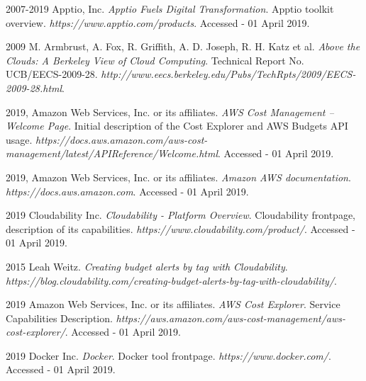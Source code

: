 \documentclass[licencjacka,en]{thesisclass}
\begin{document}
    \begin{thebibliography}{99}

        2007-2019 Apptio, Inc.
        \textit{Apptio Fuels Digital Transformation}.
        Apptio toolkit overview.
        \textit{https://www.apptio.com/products}.
        Accessed - 01 April 2019.

        2009 M. Armbrust, A. Fox, R. Griffith, A. D. Joseph, R. H. Katz et al.
        \textit{Above the Clouds: A Berkeley View of Cloud Computing}.
        Technical Report No. UCB/EECS-2009-28.
        \textit{http://www.eecs.berkeley.edu/Pubs/TechRpts/2009/EECS-2009-28.html}.

        2019, Amazon Web Services, Inc. or its affiliates.
        \textit{AWS Cost Management -- Welcome Page}.
        Initial description of the Cost Explorer and AWS Budgets API usage.
        \textit{https://docs.aws.amazon.com/aws-cost-management/latest/APIReference/Welcome.html}.
        Accessed - 01 April 2019.

        2019, Amazon Web Services, Inc. or its affiliates.
        \textit{Amazon AWS documentation}.
        \textit{https://docs.aws.amazon.com}.
        Accessed - 01 April 2019.

        2019 Cloudability Inc.
        \textit{Cloudability - Platform Overview}.
        Cloudability frontpage, description of its capabilities.
        \textit{https://www.cloudability.com/product/}.
        Accessed - 01 April 2019.

        2015 Leah Weitz.
        \textit{Creating budget alerts by tag with Cloudability}.
        \textit{https://blog.cloudability.com/creating-budget-alerts-by-tag-with-cloudability/}.

        2019 Amazon Web Services, Inc. or its affiliates.
        \textit{AWS Cost Explorer}.
        Service Capabilities Description.
        \textit{https://aws.amazon.com/aws-cost-management/aws-cost-explorer/}.
        Accessed - 01 April 2019.

        2019 Docker Inc.
        \textit{Docker}.
        Docker tool frontpage.
        \textit{https://www.docker.com/}.
        Accessed - 01 April 2019.


\end{thebibliography}
\end{document}
